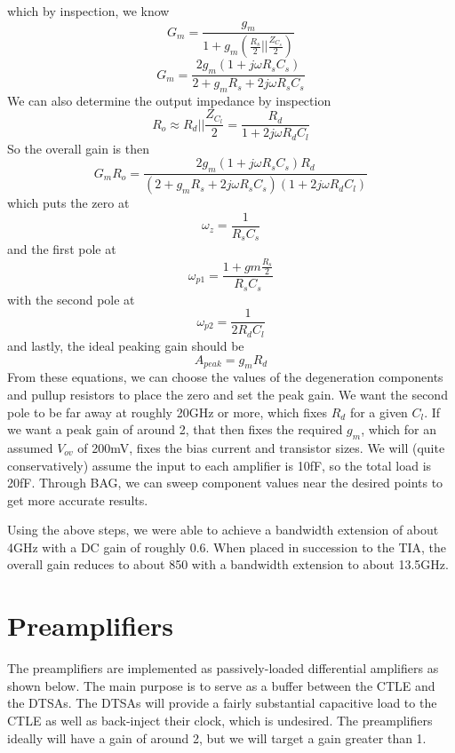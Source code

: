 which by inspection, we know
\begin{equation}
\label{Gm}
G_m=\frac{g_m}{1+g_m(\frac{R_s}{2}||\frac{Z_{C_s}}{2})}
\end{equation}
\begin{equation}
G_m=\frac{2g_m(1+j\omega R_sC_s)}{2+g_mR_s+2j\omega R_sC_s}
\end{equation}
We can also determine the output impedance by inspection
\begin{equation}
\label{Ro}
R_o\approx R_d||\frac{Z_{C_l}}{2}=\frac{R_d}{1+2j\omega R_d C_l}
\end{equation}
So the overall gain is then
\begin{equation}
\label{ctle_gain}
G_mR_o=\frac{2g_m(1+j\omega R_sC_s)R_d}{(2+g_m R_s+2j\omega R_sC_s)(1+2j\omega R_dC_l)}
\end{equation}
which puts the zero at 
\begin{equation}
\label{zero}
\omega_z=\frac{1}{R_sC_s}
\end{equation}
and the first pole at 
\begin{equation}
\label{pole_1}
\omega_{p1}=\frac{1+gm\frac{R_s}{2}}{R_sC_s}
\end{equation}
with the second pole at
\begin{equation}
\label{pole_2}
\omega_{p2}=\frac{1}{2R_dC_l}
\end{equation}
and lastly, the ideal peaking gain should be 
\begin{equation}
\label{peak gain}
A_{peak}=g_mR_d
\end{equation}
From these equations, we can choose the values of the degeneration components and pullup resistors to place the zero and set the peak gain. We want the second pole to be far away at roughly 20GHz or more, which fixes $R_d$ for a given $C_l$. If we want a peak gain of around 2, that then fixes the required $g_m$, which for an assumed $V_{ov}$ of 200mV, fixes the bias current and transistor sizes. We will (quite conservatively) assume the input to each amplifier is 10fF, so the total load is 20fF. Through BAG, we can sweep component values near the desired points to get more accurate results.

Using the above steps, we were able to achieve a bandwidth extension of about 4GHz with a DC gain of roughly 0.6. When placed in succession to the TIA, the overall gain reduces to about 850 with a bandwidth extension to about 13.5GHz.

\section{Preamplifiers}
The preamplifiers are implemented as passively-loaded differential amplifiers as shown below. The main purpose is to serve as a buffer between the CTLE and the DTSAs. The DTSAs will provide a fairly substantial capacitive load to the CTLE as well as back-inject their clock, which is undesired. The preamplifiers ideally will have a gain of around 2, but we will target a gain greater than 1. 

